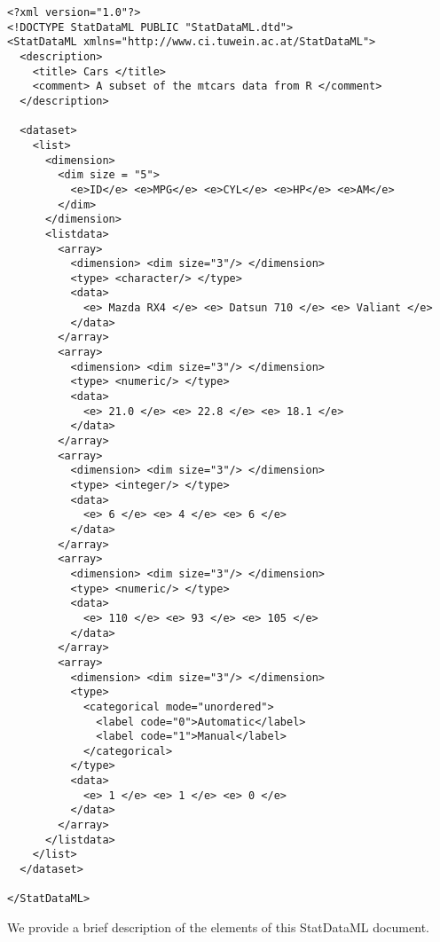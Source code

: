 
\small{
\begin{verbatim}
<?xml version="1.0"?>
<!DOCTYPE StatDataML PUBLIC "StatDataML.dtd">
<StatDataML xmlns="http://www.ci.tuwein.ac.at/StatDataML">  
  <description>
    <title> Cars </title>
    <comment> A subset of the mtcars data from R </comment>
  </description>

  <dataset>
    <list>
      <dimension>
        <dim size = "5">
          <e>ID</e> <e>MPG</e> <e>CYL</e> <e>HP</e> <e>AM</e>
        </dim>
      </dimension>
      <listdata>
        <array>
          <dimension> <dim size="3"/> </dimension>
          <type> <character/> </type>
          <data>
            <e> Mazda RX4 </e> <e> Datsun 710 </e> <e> Valiant </e>
          </data>
        </array>
        <array>
          <dimension> <dim size="3"/> </dimension>
          <type> <numeric/> </type>
          <data>
            <e> 21.0 </e> <e> 22.8 </e> <e> 18.1 </e>
          </data>
        </array>
        <array>
          <dimension> <dim size="3"/> </dimension>
          <type> <integer/> </type>
          <data>
            <e> 6 </e> <e> 4 </e> <e> 6 </e>
          </data>
        </array>
        <array>
          <dimension> <dim size="3"/> </dimension>
          <type> <numeric/> </type>
          <data>
            <e> 110 </e> <e> 93 </e> <e> 105 </e>
          </data>
        </array>
        <array>
          <dimension> <dim size="3"/> </dimension>
          <type> 
            <categorical mode="unordered">
              <label code="0">Automatic</label> 
              <label code="1">Manual</label> 
            </categorical> 
          </type>
          <data>
            <e> 1 </e> <e> 1 </e> <e> 0 </e>
          </data>
        </array>
      </listdata>
    </list>
  </dataset>

</StatDataML>
\end{verbatim}
}

We provide a brief description of the elements of this StatDataML
document.


